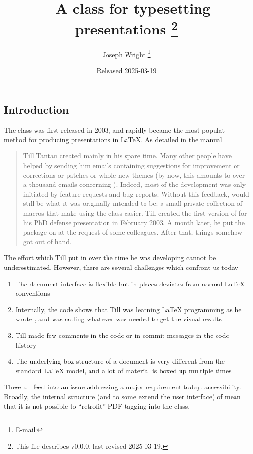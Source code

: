 \documentclass{l3doc}
\makeatletter
\let\acro\@firstofone
\def\filedate{2025-03-19}
\def\fileversion{v0.0.0}
\makeatother
\begin{document}
\title{%
   -- A class for typesetting presentations%
  \thanks{This file describes \fileversion,
    last revised \filedate.}%
}

\author{%
  Joseph Wright%
  \thanks{%
    E-mail: %
  }%
}

\date{Released \filedate}

\maketitle

\tableofcontents

\begin{documentation}

\section{Introduction%
  \label{sec:intro}}

The  class was first released in 2003, and rapidly became the
most populat method for producing presentations in \LaTeX{}. As detailed in
the  manual
\begin{quotation}
  Till Tantau created  mainly in his spare time. Many other people
  have helped by sending him emails containing suggestions for improvement or
  corrections or patches or whole new themes (by now, this amounts to over a
  thousand emails concerning ). Indeed, most of the development was
  only initiated by feature requests and bug reports. Without this feedback,
   would still be what it was originally intended to be: a small
  private collection of macros that make using the  class easier.
  Till created the first version of  for his PhD defense
  presentation in February 2003. A month later, he put the package on
  \acro{ctan} at the request of some colleagues. After that, things somehow got
  out of hand.
\end{quotation}

The effort which Till put in over the time he was developing 
cannot be underestimated. However, there are several challenges which confront
us today
\begin{enumerate}
  \item The document interface is flexible but in places deviates from normal
    \LaTeX{} conventions
  \item Internally, the code shows that Till was learning \LaTeX{} programming
    as he wrote , and was coding whatever was needed to get the
    visual results
  \item Till made few comments in the code or in commit messages in the code
    history
  \item The underlying box structure of a  document is very
    different from the standard \LaTeX{} model, and a lot of material is
    boxed up multiple times
\end{enumerate}
These all feed into an issue addressing a major requirement today:
accessibility. Broadly, the internal structure (and to some extend the user
interface) of  mean that it is not possible to \enquote{retrofit}
PDF tagging into the class.


\end{documentation}
\end{document}
